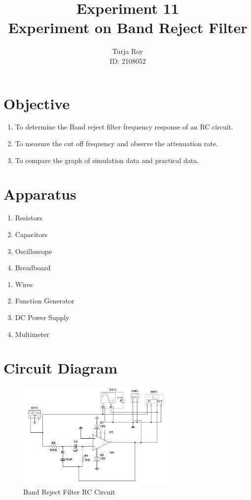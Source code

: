 \documentclass[12pt]{article}
\title{
    \textbf{Experiment 11} \\
    \textbf{Experiment on Band Reject Filter} \\
}
\author{
    Turja Roy \\
    ID: 2108052
}
\date{}
\begin{document}
\maketitle

\section{Objective}
\begin{enumerate}
    \item To determine the Band reject filter frequency response of an RC circuit. 
    \item To measure the cut off frequency and observe the attenuation rate. 
    \item To compare the graph of simulation data and practical data.
\end{enumerate}

\section{Apparatus}
\begin{multicols}{2}
    \begin{enumerate}
        \item Resistors
        \item Capacitors
        \item Oscilloscope
        \item Breadboard
    \end{enumerate}
    \columnbreak
    \begin{enumerate}
        \item Wires
        \item Function Generator
        \item DC Power Supply
        \item Multimeter
    \end{enumerate}
\end{multicols}

\section{Circuit Diagram}
\begin{figure}[h]
    \centering
    \includegraphics[width=0.7\textwidth]{BRF.png}
    \caption{Band Reject Filter RC Circuit}
\end{figure}
\end{document}
